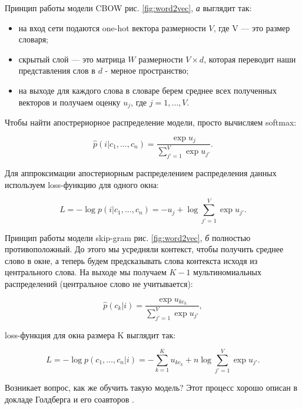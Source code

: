 Принцип работы модели CBOW рис. \ref{fig:word2vec}, \textit{а}  выглядит так:

\bigskip
\begin{itemize}
 \item на вход сети подаются one-hot вектора размерности $V$, где V --- это размер словаря;
 \item скрытый слой --- это матрица $W$ размерности $V\times d$, которая переводит наши представления слов в
$d$ - мерное пространство;
 \item на выходе для каждого слова в словаре берем среднее всех полученных векторов и получаем оценку $u_j$,
где $j = 1, \ldots, V$.
\end{itemize}

\bigskip
Чтобы найти апострериорное распределение модели, просто вычисляем softmax:

\begin{equation}
 \hat{p}(i|c_1, \ldots, c_n) = \frac{\exp{u_j}}{\sum_{j'=1}^V \exp{u_{j'}}}.
\end{equation}

Для аппроксимации апостериорным распределением распределения данных используем loss-функцию для одного окна:

\begin{equation}
 L = -\log{p(i|c_1, \ldots, c_n)} = - u_j + \log{\sum_{j'=1}^{V} \exp{u_{j'}}}.
\end{equation}

Принцип работы модели skip-gram рис. \ref{fig:word2vec}, \textit{б} полностью противоположный. До этого мы
усредняли контекст, чтобы получить среднее слово в окне, а теперь будем предсказывать слова контекста исходя
из центрального слова. На выходе мы получаем $K-1$ мультиномиальных распределений (центральное слово не
учитывается):

\begin{equation}
 \hat{p}(c_k|i) = \frac{\exp{u_{kc_k}}}{\sum_{j'=1}^V \exp{u_{j'}}},
\end{equation}

loss-функция для окна размера K выглядит так:

\begin{equation}
 L = -\log{p(c_1, \ldots, c_n|i)} = - \sum_{k=1}^{K} u_{kc_k} + n\log{\sum_{j'=1}^{V} \exp{u_{j'}}}.
\end{equation}

Возникает вопрос, как же обучить такую модель? Этот процесс хорошо описан в докладе Голдберга и его соавторов
\cite{Goldberg}.

